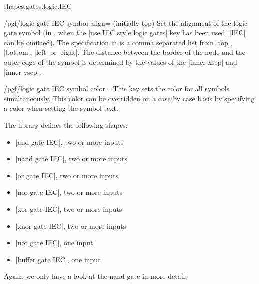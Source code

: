 \begin{pgflibrary}{shapes.gates.logic.IEC}
    \begin{key}{/pgf/logic gate IEC symbol align= (initially top)}
        Set the alignment of the logic gate symbol (in \tikzname, when the
        |use IEC style logic gates| key has been used, |IEC| can be omitted).
        The specification in  is a comma separated list from |top|,
        |bottom|, |left| or |right|. The distance between the border of the
        node and the outer edge of the symbol is determined by the values of
        the |inner xsep| and |inner ysep|.
\begin{codeexample}[preamble={\usetikzlibrary{shapes.gates.logic.IEC}}]
\end{codeexample}
    \end{key}

    \begin{key}{/pgf/logic gate IEC symbol color=}
        This key sets the color for all symbols simultaneously. This color can
        be overridden on a case by case basis by specifying a color when
        setting the symbol text.
    \end{key}

    The library defines the following shapes:
    \begin{itemize}
        \item |and gate IEC|, two or more inputs
        \item |nand gate IEC|, two or more inputs
        \item |or gate IEC|, two or more inputs
        \item |nor gate IEC|, two or more inputs
        \item |xor gate IEC|, two or more inputs
        \item |xnor gate IEC|, two or more inputs
        \item |not gate IEC|, one input
        \item |buffer gate IEC|, one input
    \end{itemize}

    Again, we only have a look at the nand-gate in more detail:


\end{pgflibrary}

